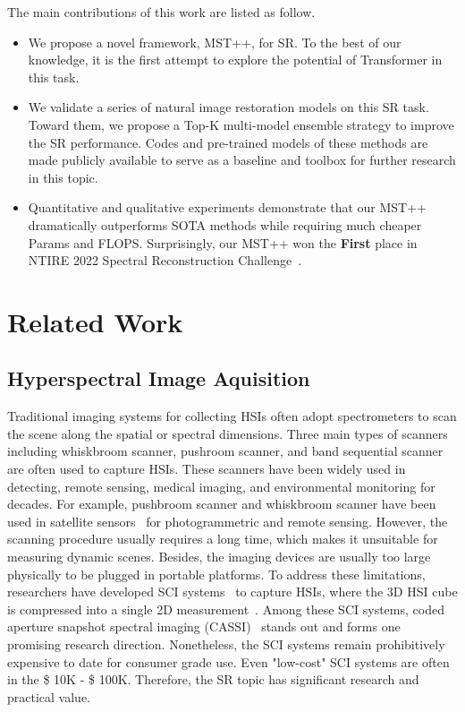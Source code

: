 \documentclass[10pt,twocolumn,letterpaper]{article}
\begin{document}
The main contributions of this work are listed as follow.
\begin{itemize}
\item We propose a novel framework, MST++, for SR. To the best of our knowledge, it is the first attempt to explore the potential of Transformer in this task. 
\item We validate a series of natural image restoration models on this SR task. Toward them, we propose a Top-K multi-model ensemble strategy to improve the SR performance. Codes and pre-trained models of these methods are made publicly available to serve as a baseline and toolbox for further research in this topic.
\item Quantitative and qualitative experiments demonstrate that our MST++ dramatically outperforms SOTA methods while requiring much cheaper Params and FLOPS. Surprisingly, our MST++ won the \textbf{First} place in NTIRE 2022 Spectral Reconstruction Challenge~\cite{arad2022ntirerecovery}.
\end{itemize}

\section{Related Work}

\subsection{Hyperspectral Image Aquisition}
Traditional imaging systems for collecting HSIs often adopt spectrometers to scan the scene along the spatial or spectral dimensions. Three main types of scanners including whiskbroom scanner, pushroom scanner, and band sequential scanner are often used to capture HSIs. These scanners have been widely used in detecting, remote sensing, medical imaging, and environmental monitoring for decades.  For example, pushbroom scanner and whiskbroom scanner have been used in satellite sensors~\cite{satellite_1,satellite_2} for photogrammetric and remote sensing. However, the scanning procedure usually requires a long time, which makes it unsuitable for measuring dynamic scenes. Besides, the imaging devices are usually too large physically to be plugged in portable platforms. To address these limitations, researchers have developed SCI systems~\cite{sci_1,sci_2,sci_3,sci_5,sci_6} to capture HSIs, where the 3D HSI cube is compressed into a single 2D measurement~\cite{Yuan_review}. Among these SCI systems, coded aperture snapshot spectral imaging (CASSI)~\cite{tsa_net,sci_2} stands out and forms one promising research direction. Nonetheless, the SCI systems remain prohibitively expensive to date for consumer grade use. Even "low-cost" SCI systems are often in the \$ 10K -  \$ 100K. Therefore, the SR topic has significant research and practical value. 
\end{document}
